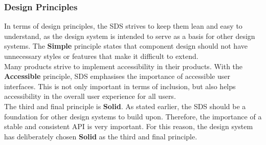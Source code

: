 \subsubsection*{Design Principles}
In terms of design principles, the \ac{SDS} strives to keep them lean and easy to understand, as the design system is intended to serve as a basis for other design systems. The \textbf{Simple} principle states that component design should not have unnecessary styles or features that make it difficult to extend. \\
Many products strive to implement accessibility in their products. With the \textbf{Accessible} principle, \ac{SDS} emphasises the importance of accessible user interfaces. This is not only important in terms of inclusion, but also helps accessibility in the overall user experience for all users. \\
The third and final principle is \textbf{Solid}. As stated earlier, the \ac{SDS} should be a foundation for other design systems to build upon. Therefore, the importance of a stable and consistent API is very important. For this reason, the design system has deliberately chosen \textbf{Solid} as the third and final principle. \\
